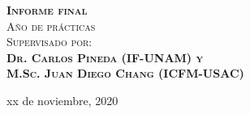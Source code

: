 \documentclass[11pt,dvipsnames]{report}
\begin{document}
\begin{titlepage}
\textsc{{\Large\bfseries Informe final}}\\
\textsc{\large Año de prácticas}\\[2cm]

\textsc{\large Supervisado por:\\
		\textbf{Dr. Carlos Pineda (IF-UNAM) y\\
		M.Sc. Juan Diego Chang (ICFM-USAC)}}


\vfill\vfill\vfill %
\vfill\vfill\vfill

{\large xx de noviembre, 2020} %




\vfill %
\end{titlepage}

\newtheorem{definition}{Definición}[section]

\newtheorem{teorema}{Teorema}[section]
\end{document}
